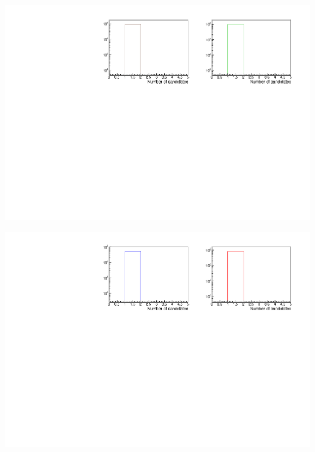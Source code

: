 \documentclass[8pt]{beamer}
\begin{document}
\begin{frame}
	\includegraphics[width=\textwidth]{VPlots/CCand}
	
	\includegraphics[width=\textwidth]{VPlots/CCandP3}
\end{frame}
\end{document}
